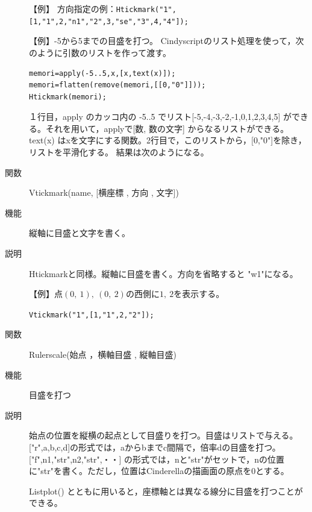 \documentclass[papersize,a4paper,10pt,uplatex]{jsarticle}
\begin{document}
\begin{description}
\vspace{\baselineskip}
【例】 方向指定の例：\verb|Htickmark("1",[1,"1",2,"n1","2",3,"se","3",4,"4"]);|

\vspace{\baselineskip}
\begin{center}

\end{center}

【例】-5から5までの目盛を打つ。
Cindyscriptのリスト処理を使って，次のように引数のリストを作って渡す。
\begin{verbatim}
memori=apply(-5..5,x,[x,text(x)]);
memori=flatten(remove(memori,[[0,"0"]]));
Htickmark(memori);
\end{verbatim}
１行目，apply のカッコ内の -5..5 でリスト[-5,-4,-3,-2,-1,0,1,2,3,4,5] ができる。それを用いて，applyで[数, 数の文字] からなるリストができる。text(x) はxを文字にする関数。2行目で，このリストから，[0,"0"]を除き，リストを平滑化する。 結果は次のようになる。

\begin{center} \scalebox{0.8}{}\end{center}

\hypertarget{vtickmark}{}
\item[関数]Vtickmark(name, [横座標 , 方向 , 文字])
\item[機能]縦軸に目盛と文字を書く。
\item[説明]Htickmarkと同様。縦軸に目盛を書く。方向を省略すると "w1"になる。

\vspace{\baselineskip}
【例】点$(0,\ 1),\ (0,\ 2)$の西側に$1,\ 2$を表示する。

\hspace{10mm}\verb|Vtickmark("1",[1,"1",2,"2"]);|

\vspace{\baselineskip}
\hypertarget{rulerscale}{}
\item[関数]Rulerscale(始点 ，横軸目盛 , 縦軸目盛)
\item[機能]目盛を打つ
\item[説明]始点の位置を縦横の起点として目盛りを打つ。目盛はリストで与える。
["r",a,b,c,d]の形式では，aからbまでc間隔で，倍率dの目盛を打つ。
["f",n1,"str",n2,"str",・・] の形式では，nと"str"がセットで，nの位置に"str"を書く。ただし，位置はCinderellaの描画面の原点を0とする。

Listplot() とともに用いると，座標軸とは異なる線分に目盛を打つことができる。


\end{description}
\end{document}
